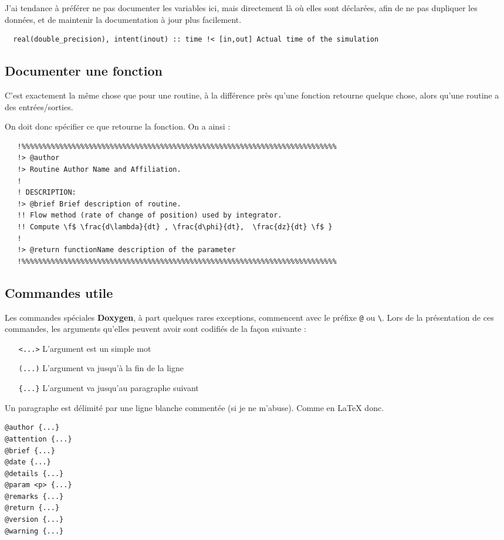 \documentclass[a4paper,twoside]{article}
\begin{document}
J'ai tendance à préférer ne pas documenter les variables ici, mais directement là où elles sont déclarées, afin de ne pas dupliquer les données, et de maintenir la documentation à jour plus facilement.
\begin{verbatim}
  real(double_precision), intent(inout) :: time !< [in,out] Actual time of the simulation
\end{verbatim}

\subsection{Documenter une fonction}
C'est exactement la même chose que pour une routine, à la différence près qu'une fonction retourne quelque chose, alors qu'une routine a des entrées/sorties. 

On doit donc spécifier ce que retourne la fonction. On a ainsi : 
\begin{verbatim}
   !%%%%%%%%%%%%%%%%%%%%%%%%%%%%%%%%%%%%%%%%%%%%%%%%%%%%%%%%%%%%%%%%%%%%%%%%%%%
   !> @author 
   !> Routine Author Name and Affiliation.
   !
   ! DESCRIPTION: 
   !> @brief Brief description of routine. 
   !! Flow method (rate of change of position) used by integrator.
   !! Compute \f$ \frac{d\lambda}{dt} , \frac{d\phi}{dt},  \frac{dz}{dt} \f$ }
   !
   !> @return functionName description of the parameter
   !%%%%%%%%%%%%%%%%%%%%%%%%%%%%%%%%%%%%%%%%%%%%%%%%%%%%%%%%%%%%%%%%%%%%%%%%%%% 
\end{verbatim}

\subsection{Commandes utile}
Les commandes spéciales \textbf{Doxygen}, à part quelques rares exceptions, commencent avec le préfixe \verb|@| ou \verb|\|. Lors de la présentation de ces commandes, les arguments qu'elles peuvent avoir sont codifiés de la façon suivante : 
\begin{itemize}
\item[\texttt{<...>}] L'argument est un simple mot
\item[\texttt{(...)}] L'argument va jusqu'à la fin de la ligne
\item[\texttt{\{...\}}] L'argument va jusqu'au paragraphe suivant
\end{itemize}

Un paragraphe est délimité par une ligne blanche commentée (si je ne m'abuse). Comme en \LaTeX{} donc.

\begin{verbatim}
@author {...}
@attention {...}
@brief {...}
@date {...}
@details {...}
@param <p> {...}
@remarks {...}
@return {...}
@version {...}
@warning {...}
\end{verbatim}
\end{document}
